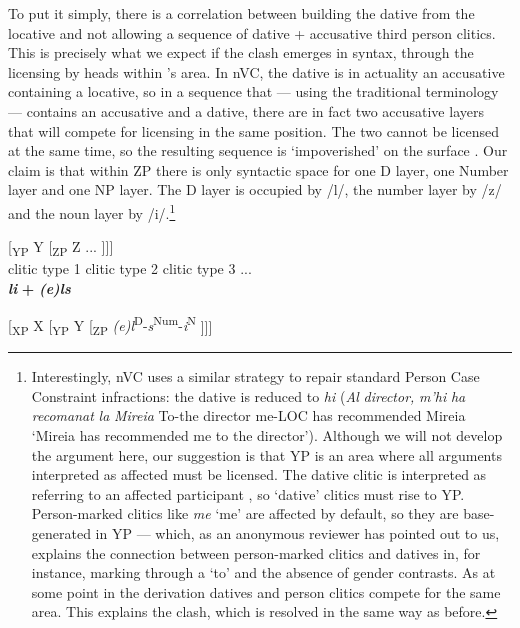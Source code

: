 \documentclass[output=paper,modfonts,nonflat,newtxmath,colorlinks,citecolor=brown]{langsci/langscibook}
\begin{document}
To put it simply, there is a correlation between building the dative from the locative and not allowing a sequence of dative + accusative third person clitics. This is precisely what we expect if the clash emerges in syntax, through the licensing by heads within \citeauthor{Sportiche1996}’s area. In nVC, the dative is in actuality an accusative containing a locative, so in a sequence that — using the traditional terminology — contains an accusative and a dative, there are in fact two accusative layers that will compete for licensing in the same position. The two cannot be licensed at the same time, so the resulting sequence is `impoverished' on the surface . Our claim is that within ZP there is only syntactic space for one D layer, one Number layer and one NP layer. The D layer is occupied by /l/, the number layer by /z/ and the noun layer by /i/.\footnote{Interestingly, nVC uses a similar strategy to repair standard Person Case Constraint infractions: the dative is reduced to \textit{hi} (\textit{Al} \textit{director,} \textit{m’hi} \textit{ha} \textit{recomanat} \textit{la} \textit{Mireia} To-the director me-LOC has recommended Mireia ‘Mireia has recommended me to the director’). Although we will not develop the argument here, our suggestion is that YP is an area where all arguments interpreted as affected must be licensed. The dative clitic is interpreted as referring to an affected participant \citep{AdgerHarbour2007}, so `dative' clitics must rise to YP. Person-marked clitics like \textit{me} ‘me’ are affected by default, so they are base{}-generated in YP — which, as an anonymous reviewer has pointed out to us, explains the connection between person-marked clitics and datives in, for instance, marking through a ‘to’ and the absence of gender contrasts. As at some point in the derivation datives and person clitics compete for the same area. This explains the clash, which is resolved in the same way as before.}

\ea%
    \label{ex:cabre:16}
    \ea \label{ex:cabre:16a}
    \gll {[\textsubscript{XP} X} { } {[\textsubscript{YP} Y} { }  {[\textsubscript{ZP}  Z} ...  ]]]\\
    \footnotesize {clitic type 1} { } \footnotesize {clitic type 2} { } \footnotesize   {clitic type 3} ...\\
    \glt  *\textbf{\textit{li}} \textbf{+} \textit{\textbf{(e)ls}}

    \ex \label{ex:cabre:16b} {[\textsubscript{XP} X}  {[\textsubscript{YP} Y}  {[\textsubscript{ZP}  \textit{(e)l}\textsuperscript{D}-\textit{s}\textsuperscript{Num}-\textit{i}\textsuperscript{N}} ]]]
    \z
\end{document}
